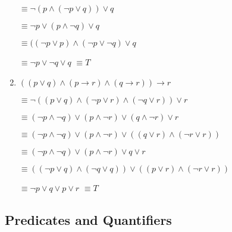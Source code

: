 \documentclass{../../cls/sig-alternate-05-2015}
\begin{document}
\begin{enumerate}
$\equiv \neg (p\wedge (\neg p \vee q))\vee q$

$\equiv \neg p\vee ( p \wedge \neg q)\vee q$

$\equiv ((\neg p\vee p) \wedge (\neg p \vee \neg q)\vee q$

$\equiv \neg p \vee \neg q\vee q$ $\equiv T$

\item $((p\vee q)\wedge (p \rightarrow r) \wedge (q\rightarrow r))\rightarrow r$

$\equiv \neg((p\vee q)\wedge (\neg p \vee r) \wedge (\neg q\vee r))\vee r$

$\equiv (\neg p\wedge \neg q)\vee (p \wedge \neg r) \vee (q\wedge \neg r)\vee r$

$\equiv (\neg p\wedge \neg q)\vee (p \wedge \neg r) \vee ((q\vee r) \wedge (\neg r\vee r))$

$\equiv (\neg p\wedge \neg q)\vee (p \wedge \neg r) \vee q\vee r$

$\equiv ((\neg p\vee q )\wedge (\neg q\vee q)) \vee ((p \vee r)\wedge (\neg r\vee r))$

$\equiv \neg p\vee q  \vee p \vee r$ $\equiv T$
\end{enumerate}

\subsection{Predicates and Quantifiers}
\end{document}
